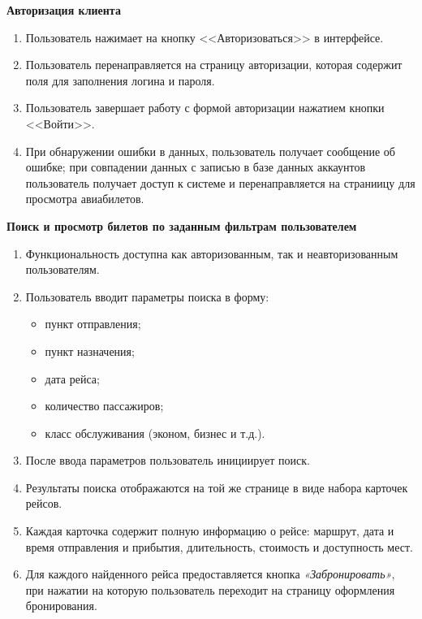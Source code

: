 \textbf{Авторизация клиента}
\begin{enumerate}
	\item Пользователь нажимает на кнопку <<Авторизоваться>> в интерфейсе.
	\item Пользователь перенаправляется на страницу авторизации, которая содержит поля для заполнения логина и пароля.
	\item Пользователь завершает работу с формой авторизации нажатием кнопки <<Войти>>.
	\item При обнаружении ошибки в данных, пользователь получает сообщение об ошибке; при совпадении данных с записью в базе данных аккаунтов пользователь получает доступ к системе и перенаправляется на страниицу для просмотра авиабилетов.
\end{enumerate}

\textbf{Поиск и просмотр билетов по заданным фильтрам пользователем}
\begin{enumerate}
    \item Функциональность доступна как авторизованным, так и неавторизованным пользователям.
    \item Пользователь вводит параметры поиска в форму:
    \begin{itemize}
        \item пункт отправления;
        \item пункт назначения;
        \item дата рейса;
        \item количество пассажиров;
        \item класс обслуживания (эконом, бизнес и т.д.).
    \end{itemize}
    \item После ввода параметров пользователь инициирует поиск.
    \item Результаты поиска отображаются на той же странице в виде набора карточек рейсов.
    \item Каждая карточка содержит полную информацию о рейсе: маршрут, дата и время отправления и прибытия, длительность, стоимость и доступность мест.
    \item Для каждого найденного рейса предоставляется кнопка \textit{«Забронировать»}, при нажатии на которую пользователь переходит на страницу оформления бронирования.
\end{enumerate}

